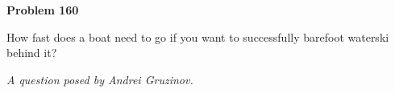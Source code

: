 \documentclass[12pt]{article}
\begin{document}
\begin{pottproblem}
\textbf{Problem 160}

How fast does a boat need to go if you want to successfully barefoot
waterski behind it?

{\normalsize\emph{A question posed by Andrei Gruzinov.}}
\end{pottproblem}
\end{document}
